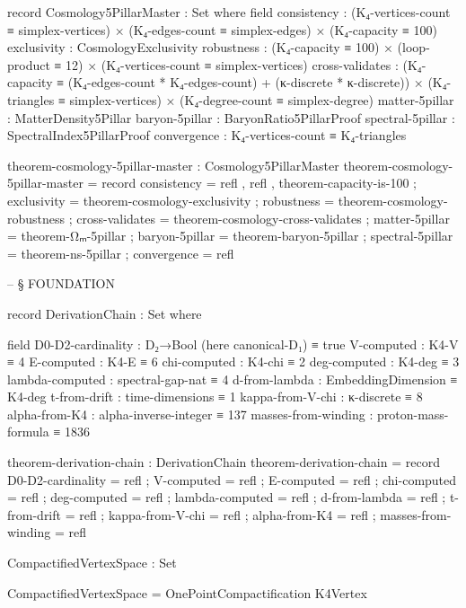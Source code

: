 \documentclass[11pt,a4paper]{book}
\begin{document}
\begin{code}
record Cosmology5PillarMaster : Set where
  field
    consistency     : (K₄-vertices-count ≡ simplex-vertices) × (K₄-edges-count ≡ simplex-edges) × (K₄-capacity ≡ 100)
    exclusivity     : CosmologyExclusivity
    robustness      : (K₄-capacity ≡ 100) × (loop-product ≡ 12) × (K₄-vertices-count ≡ simplex-vertices)
    cross-validates : (K₄-capacity ≡ (K₄-edges-count * K₄-edges-count) + (κ-discrete * κ-discrete))
                    × (K₄-triangles ≡ simplex-vertices) × (K₄-degree-count ≡ simplex-degree)
    matter-5pillar  : MatterDensity5Pillar
    baryon-5pillar  : BaryonRatio5PillarProof
    spectral-5pillar : SpectralIndex5PillarProof
    convergence     : K₄-vertices-count ≡ K₄-triangles

theorem-cosmology-5pillar-master : Cosmology5PillarMaster
theorem-cosmology-5pillar-master = record
  { consistency     = refl , refl , theorem-capacity-is-100
  ; exclusivity     = theorem-cosmology-exclusivity
  ; robustness      = theorem-cosmology-robustness
  ; cross-validates = theorem-cosmology-cross-validates
  ; matter-5pillar  = theorem-Ωₘ-5pillar
  ; baryon-5pillar  = theorem-baryon-5pillar
  ; spectral-5pillar = theorem-ns-5pillar
  ; convergence     = refl
  }


-- § FOUNDATION

record DerivationChain : Set where

  field
    D0-D2-cardinality    : D₂→Bool (here canonical-D₁) ≡ true
    V-computed           : K4-V ≡ 4
    E-computed           : K4-E ≡ 6
    chi-computed         : K4-chi ≡ 2
    deg-computed         : K4-deg ≡ 3
    lambda-computed      : spectral-gap-nat ≡ 4
    d-from-lambda        : EmbeddingDimension ≡ K4-deg
    t-from-drift         : time-dimensions ≡ 1
    kappa-from-V-chi     : κ-discrete ≡ 8
    alpha-from-K4        : alpha-inverse-integer ≡ 137
    masses-from-winding  : proton-mass-formula ≡ 1836

theorem-derivation-chain : DerivationChain
theorem-derivation-chain = record
  { D0-D2-cardinality    = refl
  ; V-computed           = refl
  ; E-computed           = refl
  ; chi-computed         = refl
  ; deg-computed         = refl
  ; lambda-computed      = refl
  ; d-from-lambda        = refl
  ; t-from-drift         = refl
  ; kappa-from-V-chi     = refl
  ; alpha-from-K4        = refl
  ; masses-from-winding  = refl
  }

CompactifiedVertexSpace : Set

CompactifiedVertexSpace = OnePointCompactification K4Vertex


\end{code}
\end{document}
